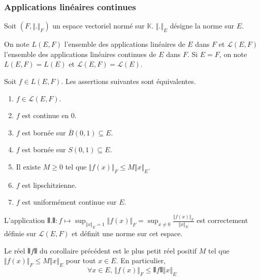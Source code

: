   \subsubsection{Applications linéaires continues}


  Soit $(F, \Vert . \Vert_F)$ un espace vectoriel normé sur $\mathbb{K}$. $\Vert . \Vert_E$ désigne la norme sur $E$.

  \begin{notation}
    On note $L(E,F)$ l'ensemble des applications linéaires de $E$ dans $F$ et $\mathcal{L}(E,F)$ l'ensemble des applications linéaires continues de $E$ dans $F$. Si $E = F$, on note $L(E,F) = L(E)$ et $\mathcal{L}(E,F) = \mathcal{L}(E)$.
  \end{notation}

  \begin{theorem}
    Soit $f \in L(E,F)$. Les assertions suivantes sont équivalentes.
    \begin{enumerate}[label=(\roman*)]
      \item $f \in \mathcal{L}(E,F)$.
      \item $f$ est continue en $0$.
      \item $f$ est bornée sur $\overline{B}(0,1) \subseteq E$.
      \item $f$ est bornée sur $S(0,1) \subseteq E$.
      \item Il existe $M \geq 0$ tel que $\Vert f(x) \Vert_F \leq M \Vert x \Vert_E$.
      \item $f$ est lipschitzienne.
      \item $f$ est uniformément continue sur $E$.
    \end{enumerate}
  \end{theorem}

  \begin{corollary}
    L'application $\VERT . \VERT : f \mapsto \sup_{\Vert x \Vert_E = 1} \Vert f(x) \Vert_F = \sup_{x \neq 0} \frac{\Vert f(x) \Vert_F}{\Vert x \Vert_E}$ est correctement définie sur $\mathcal{L}(E,F)$ et définit une norme sur cet espace.
  \end{corollary}

  \begin{remark}
    Le réel $\VERT f \VERT$ du corollaire précédent est le plus petit réel positif $M$ tel que $\Vert f(x) \Vert_F \leq M \Vert x \Vert_E$ pour tout $x \in E$. En particulier,
    \[ \forall x \in E, \, \Vert f(x) \Vert_F \leq \VERT f \VERT \Vert x \Vert_E \]
  \end{remark}


